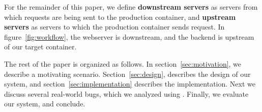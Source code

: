 For the remainder of this paper, we define \textbf{downstream servers} as servers from which requests are being sent to the production container, and \textbf{upstream servers} as servers to which the production container sends request. 
In figure~\ref{fig:workflow}, the webserver is downstream, and the backend is upstream of our target container.

The rest of the paper is organized as follows.
In section~\ref{sec:motivation}, we describe a motivating scenario.
Section~\ref{sec:design}, describes the design of our system, and section~\ref{sec:implementation} describes the implementation.
Next we discuss several real-world bugs, which we analyzed using \parikshan.
Finally, we evaluate our system, and conclude. 


%
